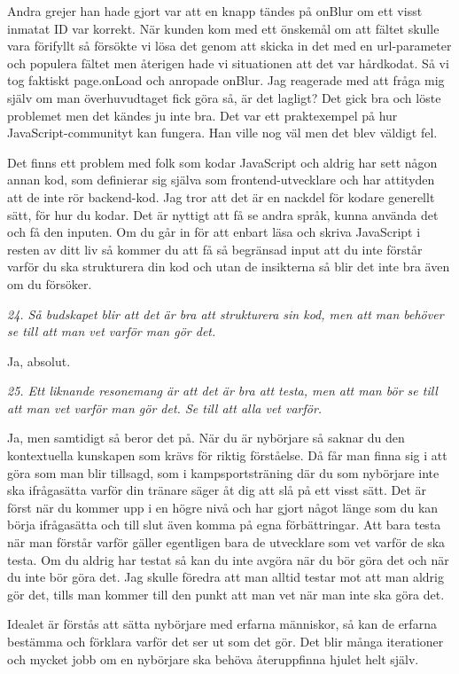 \documentclass[11pt]{article}
\begin{document}
Andra grejer han hade gjort var att en knapp tändes på onBlur om ett visst inmatat ID var korrekt. När kunden kom med ett önskemål om att fältet skulle vara förifyllt så försökte vi lösa det genom att skicka in det med en url-parameter och populera fältet men återigen hade vi situationen att det var hårdkodat. Så vi tog faktiskt page.onLoad och anropade onBlur. Jag reagerade med att fråga mig själv om man överhuvudtaget fick göra så, är det lagligt? Det gick bra och löste problemet men det kändes ju inte bra. Det var ett praktexempel på hur JavaScript-communityt kan fungera. Han ville nog väl men det blev väldigt fel.

Det finns ett problem med folk som kodar JavaScript och aldrig har sett någon annan kod, som definierar sig själva som frontend-utvecklare och har attityden att de inte rör backend-kod. Jag tror att det är en nackdel för kodare generellt sätt, för hur du kodar. Det är nyttigt att få se andra språk, kunna använda det och få den inputen. Om du går in för att enbart läsa och skriva JavaScript i resten av ditt liv så kommer du att få så begränsad input att du inte förstår varför du ska strukturera din kod och utan de insikterna så blir det inte bra även om du försöker.

\emph{24. Så budskapet blir att det är bra att strukturera sin kod, men att man behöver se till att man vet varför man gör det.}

Ja, absolut.

\emph{25. Ett liknande resonemang är att det är bra att testa, men att man bör se till att man vet varför man gör det. Se till att alla vet varför.}

Ja, men samtidigt så beror det på. När du är nybörjare så saknar du den kontextuella kunskapen som krävs för riktig förståelse. Då får man finna sig i att göra som man blir tillsagd, som i kampsportsträning där du som nybörjare inte ska ifrågasätta varför din tränare säger åt dig att slå på ett visst sätt. Det är först när du kommer upp i en högre nivå och har gjort något länge som du kan börja ifrågasätta och till slut även komma på egna förbättringar. Att bara testa när man förstår varför gäller egentligen bara de utvecklare som vet varför de ska testa. Om du aldrig har testat så kan du inte avgöra när du bör göra det och när du inte bör göra det. Jag skulle föredra att man alltid testar mot att man aldrig gör det, tills man kommer till den punkt att man vet när man inte ska göra det.

Idealet är förstås att sätta nybörjare med erfarna människor, så kan de erfarna bestämma och förklara varför det ser ut som det gör. Det blir många iterationer och mycket jobb om en nybörjare ska behöva återuppfinna hjulet helt själv.
\end{document}
